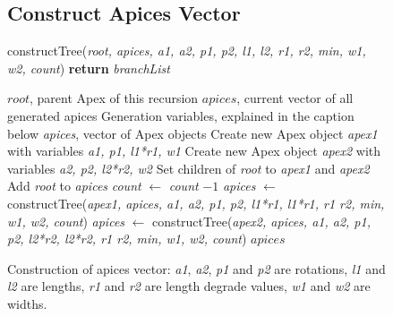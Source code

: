 \documentclass[final]{cmpreport}
\begin{document}
\begin{figure}[ht]
    \subsection{Construct Apices Vector}
    \label{app:construct-tree}
    \begin{algorithm}[H]
    \caption{constructTree(\emph{root, apices, a1, a2, p1, p2, l1, l2, r1, r2, min, w1, w2, count}) {\textbf{return}} \emph{branchList}}
        \begin{algorithmic}[1]
        \Require $root$, parent Apex of this recursion
        \Require $apices$, current vector of all generated apices
        \Require Generation variables, explained in the caption below
        \Ensure \emph{apices}, vector of Apex objects
        \State Create new Apex object \emph{apex1} with variables \emph{a1, p1, l1*r1, w1}
        \State Create new Apex object \emph{apex2} with variables \emph{a2, p2, l2*r2, w2}
        \State Set children of \emph{root} to \emph{apex1} and \emph{apex2}
        \State Add \emph{root} to \emph{apices}      
        \State \emph{count} $\leftarrow$ \emph{count} $- 1$  
                \State \emph{apices} $\leftarrow$ constructTree(\emph{apex1, apices, a1, a2, p1, p2, l1*r1, l1*r1, r1 r2, min, w1, w2, count})
            \EndIf
                \State \emph{apices} $\leftarrow$ constructTree(\emph{apex2, apices, a1, a2, p1, p2, l2*r2, l2*r2, r1 r2, min, w1, w2, count})
            \EndIf
        \EndIf
        \State \Return $apices$
        \end{algorithmic}
    \end{algorithm}
    \caption{Construction of apices vector: \emph{a1}, \emph{a2}, \emph{p1} and \emph{p2} are rotations,
            \emph{l1} and \emph{l2} are lengths, \emph{r1} and \emph{r2} are length degrade values, 
            \emph{w1} and \emph{w2} are widths.}
\end{figure}
\end{document}
